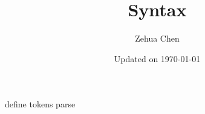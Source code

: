 \documentclass{report}
\title{Syntax}
\author{Zehua Chen}
\date{Updated on \today}
\begin{document}
  \maketitle
  \tableofcontents

  {define}
  {tokens}
  {parse}
\end{document}
